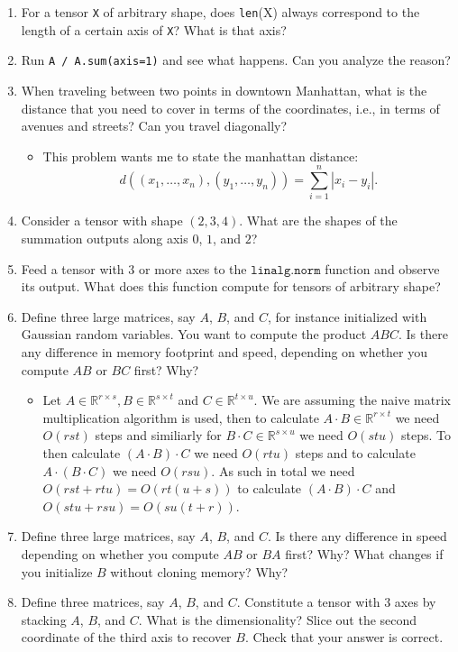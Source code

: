 \documentclass{article}
\begin{document}
\begin{enumerate}
    \item For a tensor \texttt{X} of arbitrary shape, does \texttt{len}(X) always correspond to the length of a certain axis of \texttt{X}? What is that axis?

    \item Run \texttt{A / A.\texttt{sum}(axis=1)} and see what happens. Can you analyze the reason?

    \item When traveling between two points in downtown Manhattan, what is the distance that you need to cover in terms of the coordinates, i.e., in terms of avenues and streets? Can you travel diagonally?
    	\begin{itemize}
    		\item This problem wants me to state the manhattan distance:
    		$$
    		d((x_1, \dots, x_n), (y_1, \dots, y_n)) = \sum_{i = 1}^n |x_i - y_i|.
    		$$
    	\end{itemize}

    \item Consider a tensor with shape $(2, 3, 4)$. What are the shapes of the summation outputs along axis $0$, $1$, and $2$?

    \item Feed a tensor with $3$ or more axes to the $\texttt{linalg.norm}$ function and observe its output. What does this function compute for tensors of arbitrary shape?

    \item Define three large matrices, say $A$, $B$, and $C$, for instance initialized with Gaussian random variables. You want to compute the product $ABC$. Is there any difference in memory footprint and speed, depending on whether you compute $AB$ or $BC$ first? Why?
    \begin{itemize}
    	\item Let $A \in \mathbb{R}^{r \times s}, B \in \mathbb{R}^{s \times t}$ and $C \in \mathbb{R}^{t \times u}$. We are assuming the naive matrix multiplication algorithm is used, then to calculate $A \cdot B \in \mathbb{R}^{r \times t}$ we need $O(rst)$ steps and similiarly for $B \cdot C \in \mathbb{R}^{s \times u}$ we need $O(s t u)$ steps. To then calculate $(A \cdot B) \cdot C$ we need $O(rtu)$ steps and to calculate $A \cdot (B \cdot C)$ we need $O(rsu)$. As such in total we need $O(rst + rtu) = O(rt(u + s))$ to calculate $(A \cdot B) \cdot C$ and $O(stu + rsu) = O(su(t + r))$.
    \end{itemize}

    \item Define three large matrices, say $A$, $B$, and $C$. Is there any difference in speed depending on whether you compute $AB$ or $BA$ first? Why? What changes if you initialize $B$ without cloning memory? Why?

    \item Define three matrices, say $A$, $B$, and $C$. Constitute a tensor with $3$ axes by stacking $A$, $B$, and $C$. What is the dimensionality? Slice out the second coordinate of the third axis to recover $B$. Check that your answer is correct.
\end{enumerate}
\end{document}
